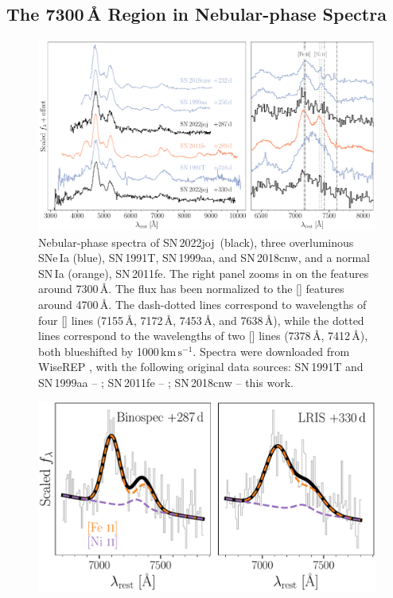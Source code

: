 \documentclass[twocolumn]{aastex631}
\newcommand{\sn}{SN\,2022joj}
\newcommand{\kms}{$\mathrm{km}\,\mathrm{s}^{-1}$}
\begin{document}
\begin{CJK*}{UTF8}{gbsn}
\subsection{The 7300\,\r{A} Region in Nebular-phase Spectra}
\label{sec:disc_nebular}
\begin{figure}
    \centering
    \includegraphics[width=\linewidth]{spec_comp_nebular.pdf}
    \caption{Nebular-phase spectra of \sn\ (black), three overluminous SNe\,Ia (blue), SN\,1991T, SN\,1999aa, and SN\,2018cnw, and a normal SN\,Ia (orange), SN\,2011fe. The right panel zooms in on the features around 7300\,\r{A}. The flux has been normalized to the [] features around 4700\,\r{A}. The dash-dotted lines correspond to wavelengths of four [] lines (7155\,\r{A}, 7172\,\r{A}, 7453\,\r{A}, and 7638\,\r{A}), while the dotted lines correspond to the wavelengths of two [] lines (7378\,\r{A}, 7412\,\r{A}), both blueshifted by 1000\,\kms. Spectra were downloaded from WiseREP \citep{wiserep_2012}, with the following original data sources: SN\,1991T and SN\,1999aa -- \citet{Silverman_UCBIa_2012}; SN\,2011fe -- \citet{Mazzali_2015}; SN\,2018cnw -- this work.}
    \label{fig:nebular_spec}
\end{figure}
\begin{figure}
    \centering
    \includegraphics[width=\linewidth]{Fe_Ni.pdf}

\end{figure}
\end{CJK*}
\end{document}
